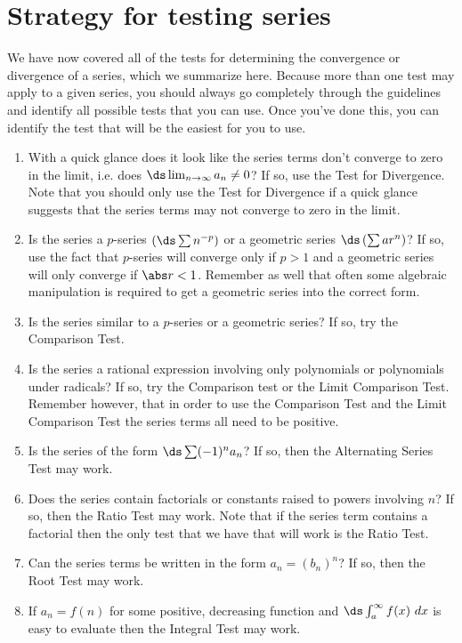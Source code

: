 \section{Strategy for testing series}\label{sec:series_techniques}

We have now covered all of the tests for determining the convergence or divergence of a series, which we summarize here. Because more than one test may apply to a given series, you should always go completely through the guidelines and identify all possible tests that you can use. Once you've done this, you can identify the test that will be the easiest for you to use.

\begin{enumerate}
\item With a quick glance does it look like the series terms don't converge to zero in the limit, i.e. does $\ds \lim_{n\to \infty}a_n \neq 0$? If so, use the Test for Divergence. Note that you should only use the Test for Divergence if a quick glance suggests that the series terms may not converge to zero in the limit.

\item Is the series a $p$-series $\left(\ds\sum n^{-p}\right)$ or a geometric series $\ds \left( \sum ar^n\right)$? If so, use the fact that $p$-series will converge only  if $p>1$ and a geometric series will only converge if $\abs r<1$. Remember as well that often some algebraic manipulation is required to get a geometric series into the correct form.

\item Is the series similar to a $p$-series or a geometric series? If so, try the Comparison Test.

\item Is the series a rational expression involving only polynomials or polynomials under radicals? If so, try the Comparison test or the Limit Comparison Test. Remember however, that in order to use the Comparison Test and the Limit Comparison Test the series terms all need to be positive.

\item Is the series of the form $\ds \sum (-1)^n a_n$? If so, then the Alternating Series Test may work.

\item Does the series contain factorials or constants raised to powers involving $n$? If so, then the Ratio Test may work. Note that if the series term contains a factorial then the only test that we have that will work is the Ratio Test.

\item Can the series terms be written in the form $a_n=(b_n)^n$? If so, then the Root Test may work.

\item If $a_n=f(n)$ for some positive, decreasing function and $\ds \int_a^\infty f(x)\ dx$ is easy to evaluate then the Integral Test may work.
\end{enumerate}

